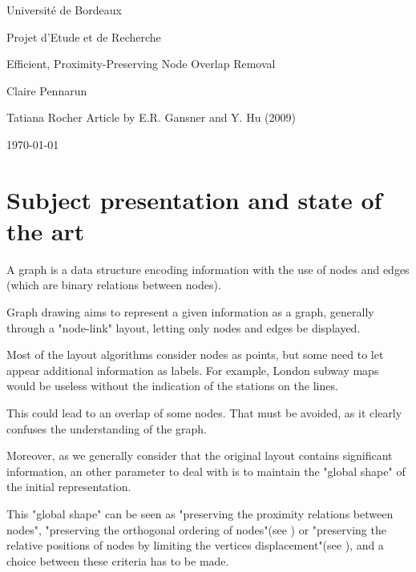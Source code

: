 \documentclass[12pt]{report}
\begin{document}
\begin{titlepage}
\begin{center}

\hfill

\bigskip
\huge{Université de Bordeaux \par \Large Projet d'Etude et de Recherche} 
\vfill
\bigskip 
\Huge 
\bigskip Efficient, Proximity-Preserving Node Overlap Removal \par 
\vfill
\Large Claire Pennarun \par 
		Tatiana Rocher
\vfill
\Large Article by E.R. Gansner and Y. Hu (2009)	
		\bigskip 
\bigskip

\Large
\today
\end{center}
\end{titlepage}

\tableofcontents
\newpage


\chapter{Subject presentation and state of the art}

A graph is a data structure encoding information with the use of nodes and edges (which are binary relations between nodes).

Graph drawing aims to represent a given information as a graph, generally through a "node-link" layout, letting only nodes and edges be displayed. 

\bigskip
Most of the layout algorithms consider nodes as points, but some need to let appear additional information as labels. For example, London subway maps would be useless without the indication of the stations on the lines.

This could lead to an overlap of some nodes. That must be avoided, as it clearly confuses the understanding of the graph.

Moreover, as we generally consider that the original layout contains significant information, an other parameter to deal with is to maintain the "global shape" of the initial representation. 

This "global shape" can be seen as "preserving the proximity relations between nodes", "preserving the orthogonal ordering of nodes"(see \cite{Mis95}) or "preserving the relative positions of nodes by limiting the vertices displacement"(see \cite{Gansner98}), and a choice between these criteria has to be made.
\end{document}
